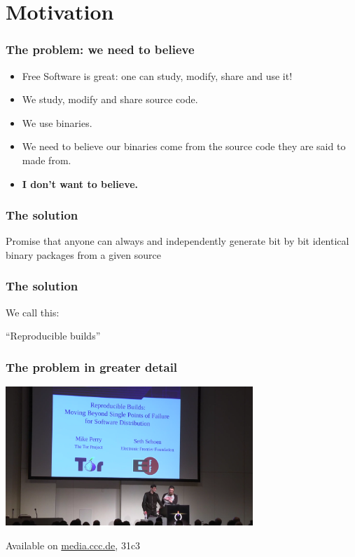 \documentclass[14pt,aspectratio=169]{beamer}
\begin{document}
\section{Motivation}

\begin{frame}[fragile]
 \frametitle{The problem: we need to believe}
 \begin{itemize}
  \item Free Software is great: one can study, modify, share and use it!
  \item<2-4> We study, modify and share source code.
  \item<2-4> We use binaries.
  \item<3-4> We need to believe our binaries come from the source code they are said to made from.
  \item<4> \textbf{I don't want to believe.}
 
 \end{itemize}
\end{frame}


\begin{frame}
 \frametitle{The solution}

 \begin{center}
 \Large{
 Promise that anyone can always and independently generate
 bit by bit identical binary packages from a given source}
\end{center}
\end{frame}


\begin{frame}
 \frametitle{The solution}

 \begin{center}
 We call this:

 \Huge{ “Reproducible builds” }
 \end{center}
\end{frame}

\begin{frame}
 \frametitle{The problem in greater detail}

 \begin{center}
  \includegraphics[width=0.7\textwidth]{images/31c3.png}

  Available on \url{media.ccc.de}, 31c3
 \end{center}
\end{frame}
\end{document}
